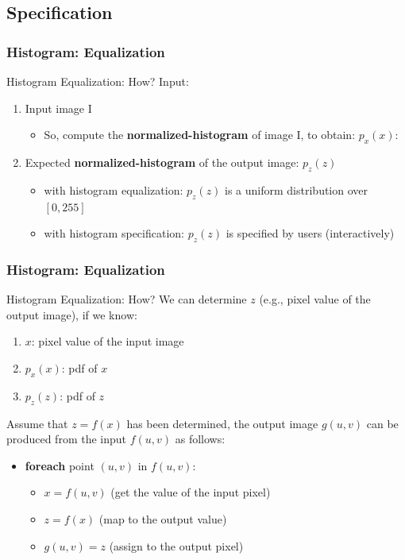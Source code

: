 \documentclass[english,11pt,table,handout]{beamer}
\begin{document}
\subsection{Specification}
\begin{frame}[fragile]
	\frametitle{Histogram: Equalization}
	
	\begin{block}{Histogram Equalization: How?}
		Input:
		\begin{enumerate}
			\item Input image I
			\begin{itemize}
				\item So, compute the \textbf{normalized-histogram} of image I, to obtain: $p_x(x)$: 
			\end{itemize}
			\item Expected \textbf{normalized-histogram} of the output image: $p_z(z)$
			\begin{itemize}
				\item with histogram equalization: $p_z(z)$ is a uniform distribution over $[0,255]$
				\item with histogram specification: $p_z(z)$ is specified by users (interactively)
			\end{itemize}
		\end{enumerate} 
	\end{block}
\end{frame}

\begin{frame}[fragile]
\frametitle{Histogram: Equalization}

\begin{block}{Histogram Equalization: How?}
	We can determine $z$ (e.g., pixel value of the output image), if we know:
	\begin{enumerate}
		\item $x$: pixel value of the input image
		\item $p_x(x)$: pdf of $x$
		\item $p_z(z)$:  pdf of $z$
	\end{enumerate} 

	Assume that $z = f(x)$ has been determined, the output image $g(u,v)$ can be produced from the input $f(u,v)$ as follows:
	\begin{itemize}
		\item \textbf{foreach} point $(u,v)$ in $f(u,v)$:
		\begin{itemize}
			\item $x = f(u,v)$ (get the value of the input pixel)
			\item $z = f(x)$  (map to the output value)
			\item $g(u,v) = z$  (assign to the output pixel)
		\end{itemize}
	\end{itemize}
\end{block}
\end{frame}
\end{document}
